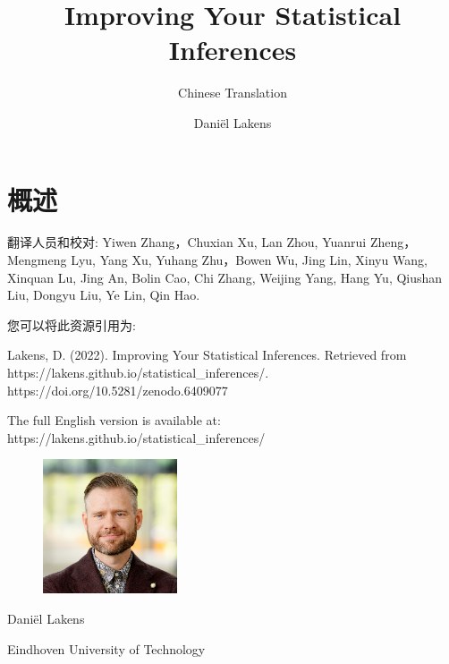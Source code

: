 \documentclass[
  letterpaper,
  DIV=11,
  numbers=noendperiod]{scrreprt}
\title{Improving Your Statistical Inferences}
\subtitle{Chinese Translation}
\author{Daniël Lakens}
\date{}
\renewcommand*\contentsname{Table of contents}
\newcommand\contentsname{Table of contents}
\begin{document}
\maketitle
\ifdefined\Shaded\renewenvironment{Shaded}{\begin{tcolorbox}[borderline west={3pt}{0pt}{shadecolor}, enhanced, frame hidden, interior hidden, boxrule=0pt, breakable, sharp corners]}{\end{tcolorbox}}\fi

\renewcommand*\contentsname{Table of contents}
{
\hypersetup{linkcolor=}
\setcounter{tocdepth}{2}
\tableofcontents
}

\hypertarget{ux6982ux8ff0}{%
\chapter*{概述}\label{ux6982ux8ff0}}


翻译人员和校对: Yiwen Zhang，Chuxian Xu, Lan Zhou, Yuanrui Zheng，
Mengmeng Lyu, Yang Xu, Yuhang Zhu，Bowen Wu, Jing Lin, Xinyu Wang,
Xinquan Lu, Jing An, Bolin Cao, Chi Zhang, Weijing Yang, Hang Yu,
Qiushan Liu, Dongyu Liu, Ye Lin, Qin Hao.

您可以将此资源引用为:

Lakens, D. (2022). Improving Your Statistical Inferences. Retrieved from
https://lakens.github.io/statistical\_inferences/.
https://doi.org/10.5281/zenodo.6409077

The full English version is available at:
https://lakens.github.io/statistical\_inferences/

\begin{figure}

\includegraphics[width=1.5625in,height=\textheight]{images/me.png} \hfill{}

\end{figure}

Daniël Lakens

Eindhoven University of Technology

\end{document}
